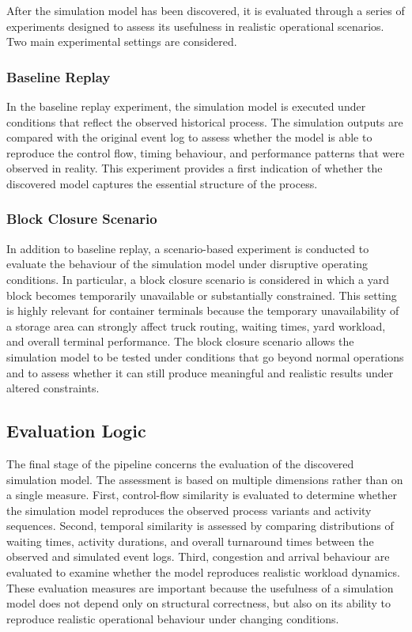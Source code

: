 After the simulation model has been discovered, it is evaluated through a series of experiments designed to assess its usefulness in realistic operational scenarios. Two main experimental settings are considered.

\subsubsection{Baseline Replay}

In the baseline replay experiment, the simulation model is executed under conditions that reflect the observed historical process. The simulation outputs are compared with the original event log to assess whether the model is able to reproduce the control flow, timing behaviour, and performance patterns that were observed in reality. This experiment provides a first indication of whether the discovered model captures the essential structure of the process.

\subsubsection{Block Closure Scenario}

In addition to baseline replay, a scenario-based experiment is conducted to evaluate the behaviour of the simulation model under disruptive operating conditions. In particular, a block closure scenario is considered in which a yard block becomes temporarily unavailable or substantially constrained. This setting is highly relevant for container terminals because the temporary unavailability of a storage area can strongly affect truck routing, waiting times, yard workload, and overall terminal performance. The block closure scenario allows the simulation model to be tested under conditions that go beyond normal operations and to assess whether it can still produce meaningful and realistic results under altered constraints.

\subsection{Evaluation Logic}

The final stage of the pipeline concerns the evaluation of the discovered simulation model. The assessment is based on multiple dimensions rather than on a single measure. First, control-flow similarity is evaluated to determine whether the simulation model reproduces the observed process variants and activity sequences. Second, temporal similarity is assessed by comparing distributions of waiting times, activity durations, and overall turnaround times between the observed and simulated event logs. Third, congestion and arrival behaviour are evaluated to examine whether the model reproduces realistic workload dynamics. These evaluation measures are important because the usefulness of a simulation model does not depend only on structural correctness, but also on its ability to reproduce realistic operational behaviour under changing conditions.

